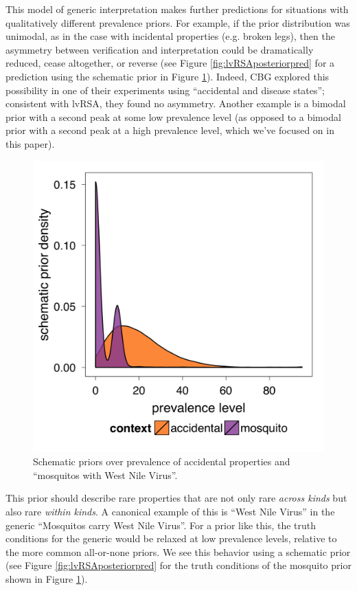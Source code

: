 \documentclass[10pt,letterpaper]{article}
\begin{document}
%
 
This model of generic interpretation makes further predictions for situations with qualitatively different prevalence priors. For example, if the prior distribution was unimodal, as in the case with incidental properties (e.g. broken legs), then the asymmetry between verification and interpretation could be dramatically reduced, cease altogether, or reverse (see Figure \ref{fig:lvRSAposteriorpred} for a prediction using the schematic prior in Figure \ref{fig:schematic}). 
Indeed, CBG explored this possibility in one of their experiments using ``accidental and disease states''; consistent with lvRSA, they found no asymmetry. 
Another example is a bimodal prior with a second peak at some low prevalence level (as opposed to a bimodal prior with a second peak at a high prevalence level, which we've focused on in this paper). 
\begin{figure}
  \begin{center}
    \includegraphics[width=0.48\columnwidth]{schematic_priors}
  \end{center}
  \caption{Schematic priors over prevalence of accidental properties and ``mosquitos with West Nile Virus''.}
   \label{fig:schematic}
\end{figure}
This prior should describe rare properties that are not only rare \emph{across kinds} but also rare \emph{within kinds}. 
%
%
A canonical example of this is ``West Nile Virus'' in the generic ``Mosquitos carry West Nile Virus''. For a prior like this, the truth conditions for the generic would be relaxed at low prevalence levels, relative to the more common all-or-none priors. We see this behavior using a schematic prior (see Figure \ref{fig:lvRSAposteriorpred} for the truth conditions of the mosquito prior shown in Figure \ref{fig:schematic}). 
\end{document}
